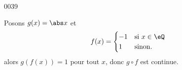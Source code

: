 
\begin{corrige}{0039}

Posons $g(x) = \abs x$ et
\begin{equation*}
  f(x) =
  \begin{cases}
    -1 & \text{si }x \in \eQ\\
    1 &  \text{sinon.}\\
  \end{cases}
\end{equation*}
alors $g(f(x)) = 1$ pour tout $x$, donc $g\circ f$ est continue.

\end{corrige}
